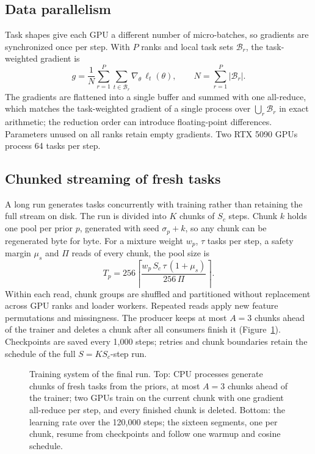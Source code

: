 \documentclass[11pt]{article}
\begin{document}
\subsection{Data parallelism}
Task shapes give each GPU a different number of micro-batches, so gradients are synchronized once
per step. With $P$ ranks and local task sets $\mathcal{B}_r$, the task-weighted gradient is
\begin{equation}
g=\frac{1}{N}\sum_{r=1}^{P}\sum_{t\in\mathcal{B}_r}\nabla_\theta\,\ell_t(\theta),\qquad
N=\sum_{r=1}^{P}|\mathcal{B}_r|.
\end{equation}
The gradients are flattened into a single buffer and summed with one all-reduce, which matches
the task-weighted gradient of a single process over $\bigcup_r\mathcal{B}_r$ in exact arithmetic;
the reduction order can introduce floating-point differences. Parameters unused on all ranks retain
empty gradients. Two RTX 5090 GPUs process 64 tasks per step.

\subsection{Chunked streaming of fresh tasks}
A long run generates tasks concurrently with training rather than retaining the full stream on disk.
The run is divided into $K$ chunks of $S_c$ steps. Chunk $k$ holds one pool per prior $p$,
generated with seed $\sigma_p+k$, so any chunk can be regenerated byte for byte. For a mixture
weight $w_p$, $\tau$ tasks per step, a safety margin $\mu_s$ and $\Pi$ reads of every chunk, the
pool size is
\begin{equation}
T_p=256\left\lceil\frac{w_p\,S_c\,\tau\,(1+\mu_s)}{256\,\Pi}\right\rceil .
\end{equation}
Within each read, chunk groups are shuffled and partitioned without replacement across GPU ranks
and loader workers. Repeated reads apply new feature permutations and missingness. The producer
keeps at most $A=3$ chunks ahead of the trainer and deletes a chunk after all consumers finish it
(Figure~\ref{fig:pipeline}). Checkpoints are saved every 1,000 steps; retries and chunk boundaries
retain the schedule of the full $S=KS_c$-step run.

\begin{figure}[tbp]
\centering
\resizebox{\linewidth}{!}{}
\caption{Training system of the final run. Top: CPU processes generate chunks of fresh tasks from
the priors, at most $A=3$ chunks ahead of the trainer; two GPUs train on the current chunk with one
gradient all-reduce per step, and every finished chunk is deleted. Bottom: the learning rate over
the 120,000 steps; the sixteen segments, one per chunk, resume from checkpoints and follow one
warmup and cosine schedule.}
\label{fig:pipeline}
\end{figure}
\end{document}
